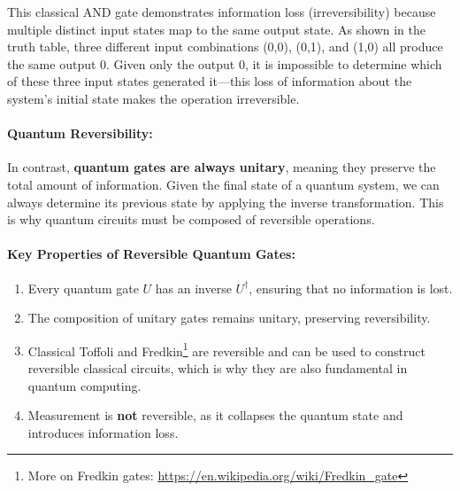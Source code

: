 \noindent This classical AND gate demonstrates information loss
(irreversibility) because multiple distinct input states map to the same
output state. As shown in the truth table, three different input
combinations (0,0), (0,1), and (1,0) all produce the same output 0. Given
only the output 0, it is impossible to determine which of these three input
states generated it—this loss of information about the system's initial
state makes the operation irreversible.

\paragraph{Quantum Reversibility:}
In contrast, \textbf{quantum gates are always unitary}, meaning they
preserve the total amount of information. Given the final state of a
quantum system, we can always determine its previous state by applying the
inverse transformation. This is why quantum circuits must be composed of
reversible operations.


\paragraph{Key Properties of Reversible Quantum Gates:}
\begin{enumerate}
  \item Every quantum gate \( U \) has an inverse \( U^\dagger \), ensuring
    that no information is lost.
  \item The composition of unitary gates remains unitary, preserving
    reversibility.
  \item Classical Toffoli and Fredkin\footnote{More on Fredkin gates: \url{https://en.wikipedia.org/wiki/Fredkin_gate}}
    are reversible and can be used to construct reversible classical circuits,
    which is why they are also fundamental in quantum computing.
  \item Measurement is \textbf{not} reversible, as it collapses the quantum
    state and introduces information loss.
\end{enumerate}

